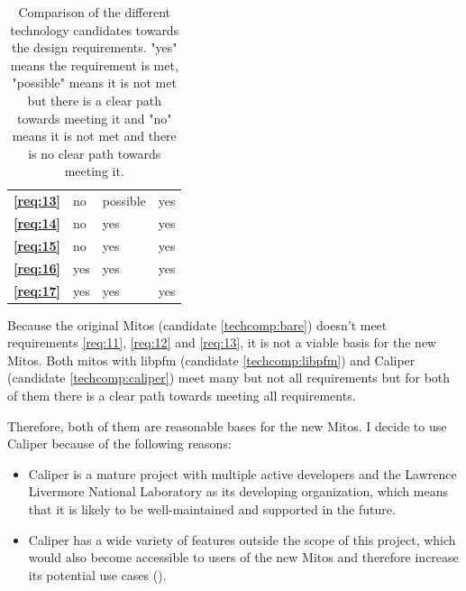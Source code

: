 \begin{table}[!ht]
\begin{tabular}{|l|lll|}
        \textbf{\ref{req:13}} & no                                  & possible                                & yes                                       \\
        \textbf{\ref{req:14}} & no                                  & yes                                     & yes                                       \\
        \textbf{\ref{req:15}} & no                                  & yes                                     & yes                                       \\
        \textbf{\ref{req:16}} & yes                                 & yes                                     & yes                                       \\
        \textbf{\ref{req:17}} & yes                                 & yes                                     & yes                                       \\ \hline
    \end{tabular}
    \caption[Comparison of the different technology candidates towards the design requirements.]{Comparison of the different technology candidates towards the design requirements. "yes" means the requirement is met, "possible" means it is not met but there is a clear path towards meeting it and "no" means it is not met and there is no clear path towards meeting it.}
    \label{table:techcomp}
\end{table}

Because the original Mitos (candidate \ref{techcomp:bare}) doesn't meet requirements \ref{req:11}, \ref{req:12} and \ref{req:13}, it is not a viable basis for the new Mitos. Both mitos with libpfm (candidate \ref{techcomp:libpfm}) and Caliper (candidate \ref{techcomp:caliper}) meet many but not all requirements but for both of them there is a clear path towards meeting all requirements.

Therefore, both of them are reasonable bases for the new Mitos. I decide to use Caliper because of the following reasons:
\begin{itemize}
    \item Caliper is a mature project with multiple active developers and the Lawrence Livermore National Laboratory as its developing organization\cite{CaliperGh}, which means that it is likely to be well-maintained and supported in the future.
    \item Caliper has a wide variety of features outside the scope of this project, which would also become accessible to users of the new Mitos and therefore increase its potential use cases ().
\end{itemize}

